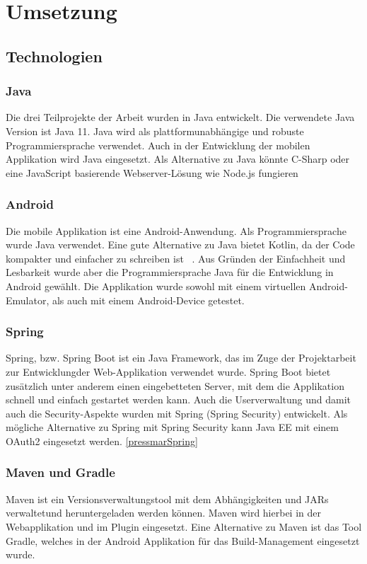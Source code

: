 \chapter{Umsetzung}
\label{chap:Umsetzung}

\section{Technologien}
\subsection{Java}
Die drei Teilprojekte der Arbeit wurden in Java entwickelt. Die verwendete Java Version ist Java 11. Java wird als plattformunabhängige und robuste Programmiersprache verwendet. Auch in der Entwicklung der mobilen Applikation wird Java eingesetzt. Als Alternative zu Java könnte C-Sharp oder eine JavaScript basierende Webserver-Lösung wie Node.js fungieren
\subsection{Android}
Die mobile Applikation ist eine Android-Anwendung. Als Programmiersprache wurde Java verwendet. Eine gute Alternative zu Java bietet Kotlin, da der Code kompakter und einfacher zu schreiben ist ~\parencite{banerjee2018comparative}. Aus Gründen der Einfachheit und Lesbarkeit wurde aber die Programmiersprache Java für die Entwicklung in Android gewählt. Die Applikation wurde sowohl mit einem virtuellen Android-Emulator, als auch mit einem Android-Device getestet.
\subsection{Spring}
Spring, bzw. Spring Boot ist ein Java Framework, das im Zuge der Projektarbeit zur Entwicklungder Web-Applikation verwendet wurde. Spring Boot bietet zusätzlich unter anderem einen eingebetteten Server,  mit dem die Applikation schnell und einfach gestartet werden kann. Auch die Userverwaltung und damit auch die Security-Aspekte wurden mit Spring (Spring Security) entwickelt. Als mögliche Alternative zu Spring mit Spring Security kann Java EE mit einem OAuth2 eingesetzt werden. \ref{pressmarSpring}
\subsection{Maven und Gradle}
Maven ist ein Versionsverwaltungstool mit dem Abhängigkeiten und JARs verwaltetund heruntergeladen werden können. Maven wird hierbei in der Webapplikation und im Plugin eingesetzt. Eine Alternative zu Maven ist das Tool Gradle, welches in der Android Applikation für das Build-Management eingesetzt wurde.
